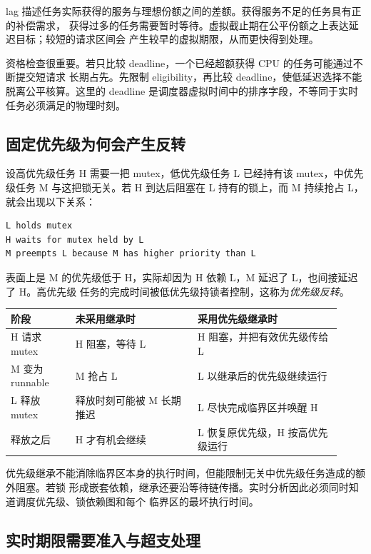lag 描述任务实际获得的服务与理想份额之间的差额。获得服务不足的任务具有正的补偿需求，
获得过多的任务需要暂时等待。虚拟截止期在公平份额之上表达延迟目标；较短的请求区间会
产生较早的虚拟期限，从而更快得到处理。

资格检查很重要。若只比较 deadline，一个已经超额获得 CPU 的任务可能通过不断提交短请求
长期占先。先限制 eligibility，再比较 deadline，使低延迟选择不能脱离公平核算。这里的
deadline 是调度器虚拟时间中的排序字段，不等同于实时任务必须满足的物理时刻。

\subsection{固定优先级为何会产生反转}

设高优先级任务 H 需要一把 mutex，低优先级任务 L 已经持有该 mutex，中优先级任务 M
与这把锁无关。若 H 到达后阻塞在 L 持有的锁上，而 M 持续抢占 L，就会出现以下关系：

\begin{lstlisting}
L holds mutex
H waits for mutex held by L
M preempts L because M has higher priority than L
\end{lstlisting}

表面上是 M 的优先级低于 H，实际却因为 H 依赖 L，M 延迟了 L，也间接延迟了 H。高优先级
任务的完成时间被低优先级持锁者控制，这称为\emph{优先级反转}。

\begin{longtable}{|L{0.18\linewidth}|L{0.34\linewidth}|L{0.4\linewidth}|}
\toprule
阶段 & 未采用继承时 & 采用优先级继承时 \\
\midrule
H 请求 mutex & H 阻塞，等待 L & H 阻塞，并把有效优先级传给 L \\\tablerowrule
M 变为 runnable & M 抢占 L & L 以继承后的优先级继续运行 \\\tablerowrule
L 释放 mutex & 释放时刻可能被 M 长期推迟 & L 尽快完成临界区并唤醒 H \\\tablerowrule
释放之后 & H 才有机会继续 & L 恢复原优先级，H 按高优先级运行 \\
\bottomrule
\end{longtable}

优先级继承不能消除临界区本身的执行时间，但能限制无关中优先级任务造成的额外阻塞。若锁
形成嵌套依赖，继承还要沿等待链传播。实时分析因此必须同时知道调度优先级、锁依赖图和每个
临界区的最坏执行时间。

\subsection{实时期限需要准入与超支处理}

